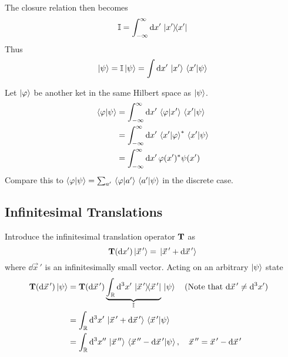 \documentclass[12pt,a4paper,titlepage]{article}
\begin{document}
The closure relation then becomes
\begin{equation}
\mathbb{I}=\int_{-\infty}^{\infty}\dd{x'}\op*{x'}{x'}
\end{equation}
Thus
\begin{equation}
\ket{\psi}=\mathbb{I}\ket{\psi}=\int\dd{x'}\ket*{x'}\ip*{x'}{\psi}
\end{equation}

Let $\ket{\varphi}$ be another ket in the same Hilbert space as $\ket{\psi}$.
\begin{equation}
\begin{aligned}
\ip{\varphi}{\psi}&=\int_{-\infty}^{\infty}\dd{x'}\ip*{\varphi}{x'}\ip*{x'}{\psi}\\
&=\int_{-\infty}^{\infty}\dd{x'}\ip*{x'}{\varphi}^{*}\ip*{x'}{\psi}\\
&=\int_{-\infty}^{\infty}\dd{x'}\varphi(x')^{*}\psi(x')
\end{aligned}
\end{equation}
Compare this to $\ip{\varphi}{\psi}=\sum_{a'}\ip*{\varphi}{a'}\ip*{a'}{\psi}$ in the discrete case.

\subsection{Infinitesimal Translations}
Introduce the infinitesimal translation operator $\vb{T}$ as
\begin{equation}
\vb{T}(\dd{x'})\ket*{\vec{x}\,'}=\ket*{\vec{x}\,'+\dd{\vec{x}\,'}}
\end{equation}
where $\dd{\vec{x}\,'}$ is an infinitesimally small vector. Acting on an arbitrary $\ket{\psi}$ state
\begin{equation}
\begin{aligned}
\vb{T}(\dd{\vec{x}\,'})\ket{\psi}&=\vb{T}(\dd{\vec{x}\,'})\underbrace{\int_{\mathbb{R}}\dd[3]{x'}\op*{\vec{x}\,'}{\vec{x}\,'}}_{\mathbb{I}}\ket*{\psi}\qq{(Note that $\dd{\vec{x}\,'}\neq\dd[3]x'$)}\\
&=\int_{\mathbb{R}}\dd[3]{x'}\ket*{\vec{x}\,'+\dd{\vec{x}\,'}}\ip*{\vec{x}\,'}{\psi}\\
&=\int_{\mathbb{R}}\dd[3]{x''}\ket*{\vec{x}\,''}\ip*{\vec{x}\,''-\dd{\vec{x}\,'}}{\psi},\qq{$\vec{x}\,''=\vec{x}\,'-\dd{\vec{x}\,'}$}
\end{aligned}
\end{equation}
\end{document}
